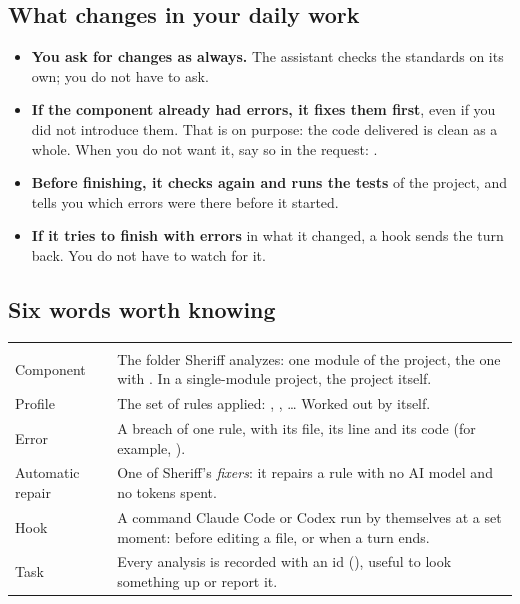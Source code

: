 \documentclass[11pt,a4paper]{article}
\begin{document}
\subsection{What changes in your daily work}

\begin{itemize}
  \item \textbf{You ask for changes as always.} The assistant checks the
        standards on its own; you do not have to ask.
  \item \textbf{If the component already had errors, it fixes them first},
        even if you did not introduce them. That is on purpose: the code
        delivered is clean as a whole. When you do not want it, say so in the
        request: .
  \item \textbf{Before finishing, it checks again and runs the tests} of the
        project, and tells you which errors were there before it started.
  \item \textbf{If it tries to finish with errors} in what it changed, a hook
        sends the turn back. You do not have to watch for it.
\end{itemize}

\subsection{Six words worth knowing}

\begin{center}
\begin{tabularx}{\linewidth}{@{\hspace{6pt}}K{33mm}L}
\headrow {} &  \\
Component & The folder Sheriff analyzes: one module of the project, the one
            with . In a single-module project, the project
            itself. \\
Profile & The set of rules applied: , ,
          \ldots{} Worked out by itself. \\
Error & A breach of one rule, with its file, its line and its code (for
        example, ). \\
Automatic repair & One of Sheriff's \emph{fixers}: it repairs a rule with no AI
        model and no tokens spent. \\
Hook & A command Claude Code or Codex run by themselves at a set moment:
       before editing a file, or when a turn ends. \\
Task & Every analysis is recorded with an id (), useful
       to look something up or report it. \\
\end{tabularx}
\end{center}
\end{document}
